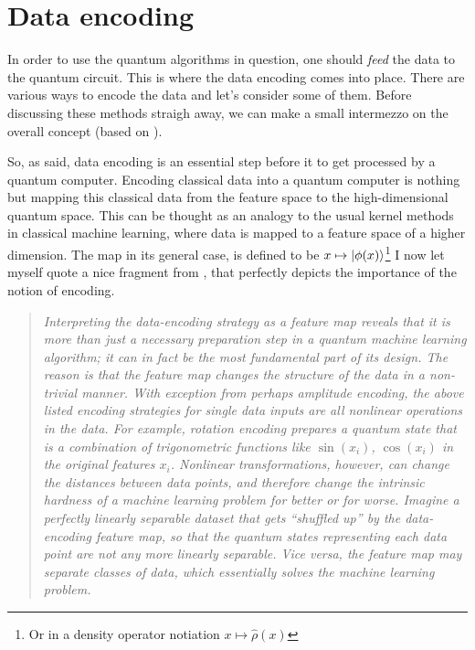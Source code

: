 \section{Data encoding}
In order to use the quantum algorithms in question, 
one should \textit{feed} the data to the quantum circuit. This is where the data encoding comes into place. 
There are various ways to encode the data and let's consider some of them.
Before discussing these methods straigh away, we can make a small intermezzo on the overall concept 
(based on \cite{schuld_machine_2018}). 

So, as said, data encoding is an essential step before it to get processed by a quantum computer. 
Encoding classical data into a quantum computer is nothing but mapping this classical data from 
the feature space to the high-dimensional quantum space. This can be thought 
as an analogy to the usual kernel methods in classical machine learning, where data is mapped to a 
feature space of a higher dimension. The map in its general case, is defined to be 
$x \mapsto \ket{\phi(x)}$\footnote{ Or in a density operator notiation $x \mapsto \widehat{\rho}(x)$}
I now let myself quote a nice fragment from \cite{schuld_machine_2018}, that perfectly depicts the 
importance of the notion of encoding.
\begin{framed}
  \begin{quote}
    \textsl{
  Interpreting the data-encoding strategy as a feature map reveals that it is more than
  just a necessary preparation step in a quantum machine learning algorithm; it can in
  fact be the most fundamental part of its design. The reason is that the feature map
  changes the structure of the data in a non-trivial manner. With exception from perhaps
amplitude encoding, the above listed encoding strategies for single data inputs are all 
nonlinear operations in the data. For example, rotation encoding prepares a quantum
state that is a combination of trigonometric functions like $\sin(x_i)$, $\cos(x_i)$ in the
original features $x_i$. Nonlinear transformations, however, can change the distances
between data points, and therefore change the intrinsic hardness of a machine learning
problem for better or for worse. Imagine a perfectly linearly separable dataset that
gets “shuffled up” by the data-encoding feature map, so that the quantum states
representing each data point are not any more linearly separable. Vice versa, the
feature map may separate classes of data, which essentially solves the machine
learning problem.}
  \end{quote}
\end{framed}



